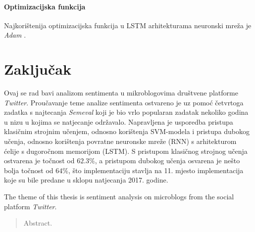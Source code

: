\documentclass[times, utf8, zavrsni]{fer}
\begin{document}
\subsubsection{Optimizacijska funkcija}

Najkorištenija optimizacijska funkcija u \gls{LSTM} arhitekturama neuronski mreža je \emph{Adam} \citep{adamoptimizer}. 

\chapter{Zaključak}



\printglossaries

\begin{sazetak}
Ovaj se rad bavi analizom sentimenta u mikroblogovima društvene platforme \emph{Twitter}. Proučavanje teme analize sentimenta ostvareno je uz pomoć četvrtoga zadatka s najtecanja \emph{Semeval} koji je bio vrlo popularan zadatak nekoliko godina u nizu u kojima se natjecanje održavalo. Napravljena je usporedba pristupa klasičnim strojnim učenjem, odnosno korištenja \gls{SVM}-modela i pristupa dubokog učenja, odnosno korištenja povratne neuronske mreže (\gls{RNN}) s arhitekturom ćelije s dugoročnom memorijom (\gls{LSTM}). S pristupom klasičnog strojnog učenja ostvarena je točnost od $62.3\%$, a pristupom dubokog učenja osvarena je nešto bolja točnost od $64\%$, što implementaciju stavlja na 11. mjesto implementacija koje su bile predane u sklopu natjecanja 2017. godine.

\end{sazetak}

The theme of this thesis is sentiment analysis on microblogs from the social platform \emph{Twitter}. %

\begin{abstract}
Abstract.

\end{abstract}
\end{document}
